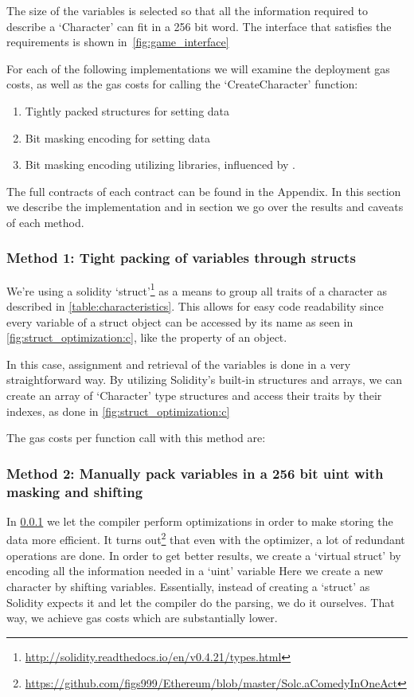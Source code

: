 


The size of the variables is selected so that all the information required to describe a `Character' can fit in a 256 bit word. The interface that satisfies the requirements is shown in~\ref{fig:game_interface}

For each of the following implementations we will examine the deployment gas costs, as well as the gas costs for calling the `CreateCharacter' function:

\begin{enumerate}
    \item Tightly packed structures for setting data
    \item Bit masking encoding for setting data
    \item Bit masking encoding utilizing libraries, influenced by \cite{virtualstruct}.
\end{enumerate}

The full contracts of each contract can be found in the Appendix. In this section we describe the implementation and in section \label{results} we go over the results and caveats of each method.

\subsubsection{Method 1: Tight packing of variables through structs} \label{method1}
We're using a solidity `struct'\footnote{\url{http://solidity.readthedocs.io/en/v0.4.21/types.html}} as a means to group all traits of a character as described in \ref{table:characteristics}. This allows for easy code readability since every variable of a struct object can be accessed by its name as seen in \ref{fig:struct_optimization:c}, like the property of an object. 

In this case, assignment and retrieval of the variables is done in a very straightforward way. By utilizing Solidity's built-in structures and arrays, we can create an array of `Character' type structures and access their traits by their indexes, as done in \ref{fig:struct_optimization:c}

The gas costs per function call with this method are: 


\subsubsection{Method 2: Manually pack variables in a 256 bit uint with masking and shifting} \label{method2}
In \ref{method1} we let the compiler perform optimizations in order to make storing the data more efficient. It turns out\footnote{\url{https://github.com/figs999/Ethereum/blob/master/Solc.aComedyInOneAct}} that even with the optimizer, a lot of redundant operations are done. In order to get better results, we create a `virtual struct' by encoding all the information needed in a `uint' variable 
Here we create a new character by shifting variables. Essentially, instead of creating a `struct' as Solidity expects it and let the compiler do the parsing, we do it ourselves. That way, we achieve gas costs which are substantially lower.

